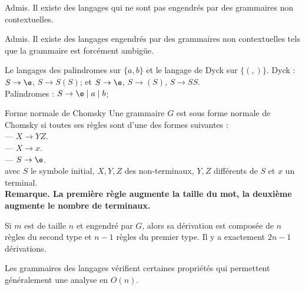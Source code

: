 \documentclass[french, 11pt]{article}
\begin{document}
\begin{prop}{Admis.}{}
    Il existe des langages qui ne sont pas engendrés par des grammaires non contextuelles.
\end{prop}

\begin{prop}{Admis.}{}
    Il existe des langages engendrés par des grammaires non contextuelles tels que la grammaire est forcément ambigüe.
\end{prop}

\begin{ex}{}{}
    Le langages des palindromes sur $\{a,b\}$ et le langage de Dyck sur $\{(,)\}$.
    \tcblower
    Dyck : $S\to \e$, $S\to S(S)$; et $S\to\e$, $S\to(S)$, $S\to SS$.\\
    Palindromes : $S\to\e\mid a\mid b$;
\end{ex}

\begin{defi}{Forme normale de Chomsky}{}
    Une grammaire $G$ est sous forme normale de Chomsky si toutes ses règles sont d'une des formes suivantes :\\
    --- $X \to YZ$.\\
    --- $X \to x$.\\
    --- $S \to \e$.\\
    avec $S$ le symbole initial, $X,Y,Z$ des non-terminaux, $Y,Z$ différents de $S$ et $x$ un terminal.\\
    \bf{Remarque.} La première règle augmente la taille du mot, la deuxième augmente le nombre de terminaux.
\end{defi}

\begin{prop}{}{}
    Si $m$ est de taille $n$ et engendré par $G$, alors sa dérivation est composée de $n$ règles du second type et $n-1$ règles du premier type. Il y a exactement $2n-1$ dérivations.
\end{prop}

Les grammaires des langages vérifient certaines propriétés qui permettent généralement une analyse en $O(n)$.
\end{document}
